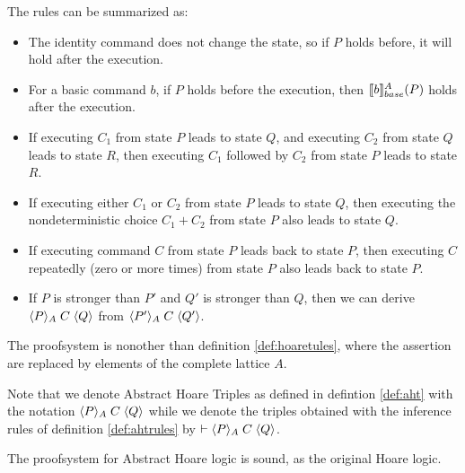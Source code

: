 \documentclass[
  10pt,       %
  twoside,    %
  a4paper,    %
  english,    %
  tikz,       %
  openright,  %
]{book}
\begin{document}
The rules can be summarized as:
\begin{itemize}
  \item The identity command does not change the state, so if $P$ holds before,
    it will hold after the execution.

  \item For a basic command $b$, if $P$ holds before the execution, then 
    $\llbracket b \rrbracket_{base}^A(P)$ holds after the execution.

  \item If executing $C_1$ from state $P$ leads to state $Q$, and executing
    $C_2$ from state $Q$ leads to state $R$, then executing $C_1$ followed by
    $C_2$ from state $P$ leads to state $R$.

  \item If executing either $C_1$ or $C_2$ from state $P$ leads to state $Q$,
    then executing the nondeterministic choice $C_1 + C_2$ from state $P$ also
    leads to state $Q$.

  \item If executing command $C$ from state $P$ leads back to state $P$, then
    executing $C$ repeatedly (zero or more times) from state $P$ also leads
    back to state $P$.

  \item If $P$ is stronger than $P'$ and $Q'$ is stronger than $Q$, then we can
    derive $\langle P \rangle_{A} \; C \; \langle Q \rangle$ from $\langle P' \rangle_{A} \; C \; \langle Q' \rangle$.
\end{itemize}

The proofsystem is nonother than definition \ref{def:hoaretules},
where the assertion are replaced by elements of the complete lattice $A$.

Note that we denote Abstract Hoare Triples as defined in defintion \ref{def:aht}
with the notation $\langle P \rangle_{A} \; C \; \langle Q \rangle$ while we denote the triples obtained
with the inference rules of definition \ref{def:ahtrules} by $\vdash 
\langle P \rangle_{A} \; C \; \langle Q \rangle$.

The proofsystem for Abstract Hoare logic is sound, as the original Hoare logic.
\end{document}
